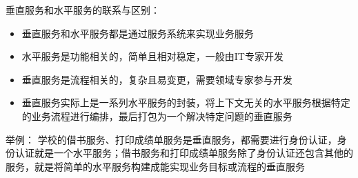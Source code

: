 \begin{solution}
    
    垂直服务和水平服务的联系与区别：
    \begin{itemize}
        \item 垂直服务和水平服务都是通过服务系统来实现业务服务
        \item 水平服务是功能相关的，简单且相对稳定，一般由IT专家开发
        \item 垂直服务是流程相关的，复杂且易变更，需要领域专家参与开发
        \item 垂直服务实际上是一系列水平服务的封装，将上下文无关的水平服务根据特定的业务流程进行编排，最后打包为一个解决特定问题的垂直服务
    \end{itemize}
    
    举例：
    学校的借书服务、打印成绩单服务是垂直服务，都需要进行身份认证，身份认证就是一个水平服务；借书服务和打印成绩单服务除了身份认证还包含其他的服务，就是将简单的水平服务构建成能实现业务目标或流程的垂直服务
    \end{solution}
